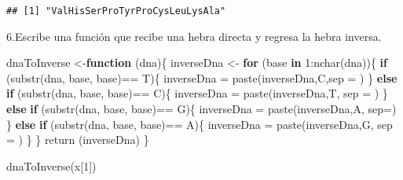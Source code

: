 \documentclass[
]{article}
\newenvironment{Shaded}{\begin{snugshade}}{\end{snugshade}}
\newcommand{\AttributeTok}[1]{\textcolor[rgb]{0.77,0.63,0.00}{#1}}
\newcommand{\ControlFlowTok}[1]{\textcolor[rgb]{0.13,0.29,0.53}{\textbf{#1}}}
\newcommand{\DecValTok}[1]{\textcolor[rgb]{0.00,0.00,0.81}{#1}}
\newcommand{\FunctionTok}[1]{\textcolor[rgb]{0.00,0.00,0.00}{#1}}
\newcommand{\NormalTok}[1]{#1}
\newcommand{\OtherTok}[1]{\textcolor[rgb]{0.56,0.35,0.01}{#1}}
\newcommand{\SpecialCharTok}[1]{\textcolor[rgb]{0.00,0.00,0.00}{#1}}
\newcommand{\StringTok}[1]{\textcolor[rgb]{0.31,0.60,0.02}{#1}}
\begin{document}
\begin{verbatim}
## [1] "ValHisSerProTyrProCysLeuLysAla"
\end{verbatim}

6.Escribe una función que recibe una hebra directa y regresa la hebra
inversa.

\begin{Shaded}
\begin{Highlighting}[]
\NormalTok{dnaToInverse }\OtherTok{\textless{}{-}}\ControlFlowTok{function}\NormalTok{ (dna)\{}
\NormalTok{  inverseDna }\OtherTok{\textless{}{-}}\StringTok{\textquotesingle{}\textquotesingle{}}
  \ControlFlowTok{for}\NormalTok{ (base }\ControlFlowTok{in} \DecValTok{1}\SpecialCharTok{:}\FunctionTok{nchar}\NormalTok{(dna))\{}
    \ControlFlowTok{if}\NormalTok{ (}\FunctionTok{substr}\NormalTok{(dna, base, base)}\SpecialCharTok{==} \StringTok{\textquotesingle{}T\textquotesingle{}}\NormalTok{)\{}
\NormalTok{      inverseDna }\OtherTok{=} \FunctionTok{paste}\NormalTok{(inverseDna,}\StringTok{\textquotesingle{}C\textquotesingle{}}\NormalTok{,}\AttributeTok{sep =} \StringTok{\textquotesingle{}\textquotesingle{}}\NormalTok{)}
\NormalTok{    \}}
    \ControlFlowTok{else} \ControlFlowTok{if}\NormalTok{ (}\FunctionTok{substr}\NormalTok{(dna, base, base)}\SpecialCharTok{==} \StringTok{\textquotesingle{}C\textquotesingle{}}\NormalTok{)\{}
\NormalTok{      inverseDna }\OtherTok{=} \FunctionTok{paste}\NormalTok{(inverseDna,}\StringTok{\textquotesingle{}T\textquotesingle{}}\NormalTok{, }\AttributeTok{sep =} \StringTok{\textquotesingle{}\textquotesingle{}}\NormalTok{)   }
\NormalTok{    \}}
   \ControlFlowTok{else} \ControlFlowTok{if}\NormalTok{ (}\FunctionTok{substr}\NormalTok{(dna, base, base)}\SpecialCharTok{==} \StringTok{\textquotesingle{}G\textquotesingle{}}\NormalTok{)\{}
\NormalTok{      inverseDna }\OtherTok{=} \FunctionTok{paste}\NormalTok{(inverseDna,}\StringTok{\textquotesingle{}A\textquotesingle{}}\NormalTok{, }\AttributeTok{sep=}\StringTok{\textquotesingle{}\textquotesingle{}}\NormalTok{)}
\NormalTok{    \}}
   \ControlFlowTok{else} \ControlFlowTok{if}\NormalTok{ (}\FunctionTok{substr}\NormalTok{(dna, base, base)}\SpecialCharTok{==} \StringTok{\textquotesingle{}A\textquotesingle{}}\NormalTok{)\{}
\NormalTok{      inverseDna }\OtherTok{=} \FunctionTok{paste}\NormalTok{(inverseDna,}\StringTok{\textquotesingle{}G\textquotesingle{}}\NormalTok{, }\AttributeTok{sep =} \StringTok{\textquotesingle{}\textquotesingle{}}\NormalTok{)   }
\NormalTok{    \}}
\NormalTok{  \}}
  \FunctionTok{return}\NormalTok{ (inverseDna)}
\NormalTok{\}}

\FunctionTok{dnaToInverse}\NormalTok{(x[}\DecValTok{1}\NormalTok{])}
\end{Highlighting}
\end{Shaded}
\end{document}
